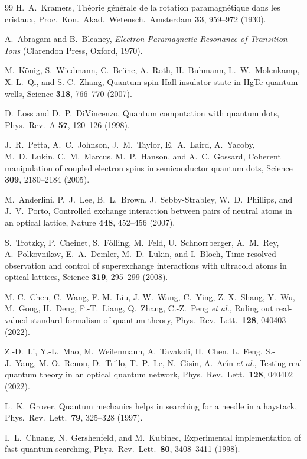 \documentclass[aps,pra,onecolumn,superscriptaddress,nofootinbib,10pt]{revtex4-2}
\theoremstyle{definition}
\theoremstyle{remark}
\begin{document}
\begin{thebibliography}{99}
 H.~A.~Kramers, Th\'eorie g\'en\'erale de la rotation paramagn\'etique dans les cristaux, Proc.\ Kon.\ Akad.\ Wetensch.\ Amsterdam \textbf{33}, 959--972 (1930).

 A.~Abragam and B.~Bleaney, \emph{Electron Paramagnetic Resonance of Transition Ions} (Clarendon Press, Oxford, 1970).

 M.~K\"onig, S.~Wiedmann, C.~Br\"une, A.~Roth, H.~Buhmann, L.~W.~Molenkamp, X.-L.~Qi, and S.-C.~Zhang, Quantum spin Hall insulator state in HgTe quantum wells, Science \textbf{318}, 766--770 (2007).

 D.~Loss and D.~P.~DiVincenzo, Quantum computation with quantum dots, Phys.\ Rev.\ A \textbf{57}, 120--126 (1998).

 J.~R.~Petta, A.~C.~Johnson, J.~M.~Taylor, E.~A.~Laird, A.~Yacoby, M.~D.~Lukin, C.~M.~Marcus, M.~P.~Hanson, and A.~C.~Gossard, Coherent manipulation of coupled electron spins in semiconductor quantum dots, Science \textbf{309}, 2180--2184 (2005).

 M.~Anderlini, P.~J.~Lee, B.~L.~Brown, J.~Sebby-Strabley, W.~D.~Phillips, and J.~V.~Porto, Controlled exchange interaction between pairs of neutral atoms in an optical lattice, Nature \textbf{448}, 452--456 (2007).

 S.~Trotzky, P.~Cheinet, S.~F\"olling, M.~Feld, U.~Schnorrberger, A.~M.~Rey, A.~Polkovnikov, E.~A.~Demler, M.~D.~Lukin, and I.~Bloch, Time-resolved observation and control of superexchange interactions with ultracold atoms in optical lattices, Science \textbf{319}, 295--299 (2008).

 M.-C.~Chen, C.~Wang, F.-M.~Liu, J.-W.~Wang, C.~Ying, Z.-X.~Shang, Y.~Wu, M.~Gong, H.~Deng, F.-T.~Liang, Q.~Zhang, C.-Z.~Peng \emph{et al.}, Ruling out real-valued standard formalism of quantum theory, Phys.\ Rev.\ Lett.\ \textbf{128}, 040403 (2022).

 Z.-D.~Li, Y.-L.~Mao, M.~Weilenmann, A.~Tavakoli, H.~Chen, L.~Feng, S.-J.~Yang, M.-O.~Renou, D.~Trillo, T.~P.~Le, N.~Gisin, A.~Ac\'{\i}n \emph{et al.}, Testing real quantum theory in an optical quantum network, Phys.\ Rev.\ Lett.\ \textbf{128}, 040402 (2022).

 L.~K.~Grover, Quantum mechanics helps in searching for a needle in a haystack, Phys.\ Rev.\ Lett.\ \textbf{79}, 325--328 (1997).

 I.~L.~Chuang, N.~Gershenfeld, and M.~Kubinec, Experimental implementation of fast quantum searching, Phys.\ Rev.\ Lett.\ \textbf{80}, 3408--3411 (1998).


\end{thebibliography}
\end{document}
